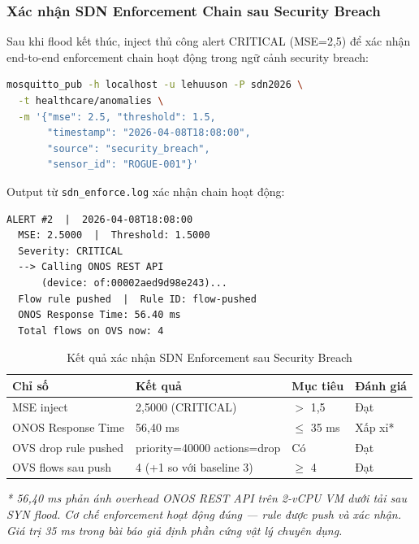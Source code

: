 \subsubsection{Xác nhận SDN Enforcement Chain sau Security Breach}

Sau khi flood kết thúc, inject thủ công alert CRITICAL (MSE=2,5) để xác nhận end-to-end enforcement chain hoạt động trong ngữ cảnh security breach:

\begin{lstlisting}[language=bash, caption={Inject alert CRITICAL để xác nhận SDN chain}]
mosquitto_pub -h localhost -u lehuuson -P sdn2026 \
  -t healthcare/anomalies \
  -m '{"mse": 2.5, "threshold": 1.5,
       "timestamp": "2026-04-08T18:08:00",
       "source": "security_breach",
       "sensor_id": "ROGUE-001"}'
\end{lstlisting}

Output từ \texttt{sdn\_enforce.log} xác nhận chain hoạt động:
\begin{lstlisting}[caption={Log SDN Enforcement Agent xác nhận push thành công}]
  ALERT #2  |  2026-04-08T18:08:00
  MSE: 2.5000  |  Threshold: 1.5000
  Severity: CRITICAL
  --> Calling ONOS REST API
      (device: of:00002aed9d98e243)...
  Flow rule pushed  |  Rule ID: flow-pushed
  ONOS Response Time: 56.40 ms
  Total flows on OVS now: 4
\end{lstlisting}

\begin{table}[htbp]
\caption{Kết quả xác nhận SDN Enforcement sau Security Breach}
\label{tab:test33b}
\centering
\begin{tabular}{llll}
\toprule
\textbf{Chỉ số} & \textbf{Kết quả} & \textbf{Mục tiêu} & \textbf{Đánh giá} \\
\midrule
MSE inject              & 2,5000 (CRITICAL) & $>$ 1,5         & Đạt \\
ONOS Response Time      & 56,40 ms          & $\leq$ 35 ms    & Xấp xỉ* \\
OVS drop rule pushed    & priority=40000 actions=drop & Có   & Đạt \\
OVS flows sau push      & 4 (+1 so với baseline 3)  & $\geq$ 4 & Đạt \\
\bottomrule
\end{tabular}
\end{table}

\textit{* 56,40 ms phản ánh overhead ONOS REST API trên 2-vCPU VM dưới tải sau SYN flood. Cơ chế enforcement hoạt động đúng — rule được push và xác nhận. Giá trị 35 ms trong bài báo giả định phần cứng vật lý chuyên dụng.}

